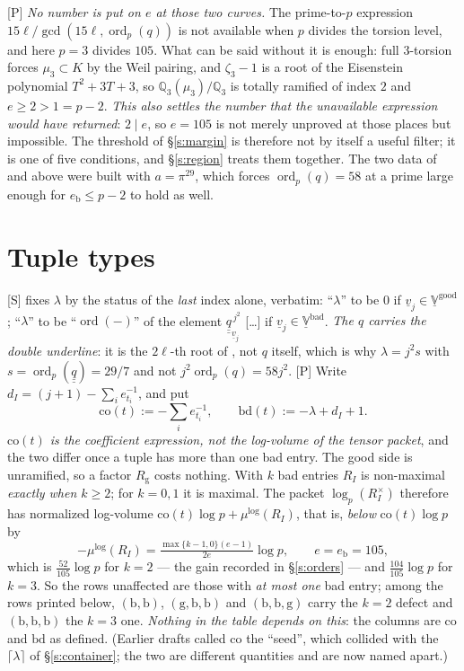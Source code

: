\documentclass[11pt]{article}
\theoremstyle{plain}
\theoremstyle{definition}
\newcommand{\Vbad}{\underline{\mathbb{V}}^{\mathrm{bad}}}
\newcommand{\ord}{\operatorname{ord}}
\newcommand{\qbb}{\underline{\underline q}}
\begin{document}
\textup{[P]} \emph{No number is put on $e$ at those two curves.}  The prime-to-$p$
expression $15\ell/\gcd(15\ell,\ord_p(q))$ is not available when $p$
divides the torsion level, and here $p=3$ divides $105$.  What can be said without it is
enough: full $3$-torsion forces $\mu_3\subset K$ by the Weil pairing, and
$\zeta_3-1$ is a root of the Eisenstein polynomial $T^2+3T+3$, so
$\mathbb{Q}_3(\mu_3)/\mathbb{Q}_3$ is totally ramified of index $2$ and $e\ge2>1=p-2$.
\emph{This also settles the number that the unavailable expression would have
returned}: $2\mid e$, so $e=105$ is not merely unproved at those places but impossible.  The threshold of \S\ref{s:margin} is therefore not by itself
a useful filter; it is one of five conditions, and \S\ref{s:region} treats them
together.  The two data of \cite{First} and above were built with $a=\pi^{29}$, which
forces $\ord_p(q)=58$ at a prime large enough for $e_{\mathrm b}\le p-2$ to hold as
well.

\section{Tuple types}\label{s:tuple}

\textup{[S]} \cite[Thm.~1.10, Step (v)]{IUT4} fixes $\lambda$ by the status of the
\emph{last} index alone, verbatim: ``$\lambda$'' to be $0$ if $\underline
v_j\in\underline{\mathbb V}^{\mathrm{good}}$; ``$\lambda$'' to be ``$\ord(-)$'' of the
element $\qbb_{\underline v_j}^{\,j^2}$ [\dots] if $\underline v_j\in\Vbad$.
\emph{The $q$ carries the double underline}: it is the $2\ell$-th root of
\cite[Ex.~3.2(iv)]{IUT1}, not $q$ itself, which is why $\lambda=j^2s$ with
$s=\ord_p(\qbb)=29/7$ and not $j^2\ord_p(q)=58j^2$.  \textup{[P]} Write $d_I=(j+1)-\sum_i e_{t_i}^{-1}$, and put
\[
  \mathrm{co}(t):=-\sum_i e_{t_i}^{-1},\qquad
  \mathrm{bd}(t):=-\lambda+d_I+1 .
\]
\emph{$\mathrm{co}(t)$ is the coefficient expression, not the log-volume of the
tensor packet}, and the two differ once a tuple has more than one bad entry.  The good
side is unramified, so a factor $R_{\mathrm g}$ costs nothing.  With $k$ bad entries
$R_I$ is non-maximal \emph{exactly when $k\ge2$}; for $k=0,1$ it is maximal.  The packet
$\log_p(R_I^{\times})$ therefore has normalized log-volume
$\mathrm{co}(t)\log p+\mu^{\log}(R_I)$, that is, \emph{below} $\mathrm{co}(t)\log p$ by
\[
  -\mu^{\log}(R_I)=\tfrac{\max\{k-1,0\}(e-1)}{2e}\log p,\qquad e=e_{\mathrm b}=105,
\]
which is $\tfrac{52}{105}\log p$ for $k=2$ --- the gain recorded in \S\ref{s:orders} ---
and $\tfrac{104}{105}\log p$ for $k=3$.  So the rows unaffected are those with
\emph{at most one} bad entry; among the rows printed below, $(\mathrm b,\mathrm b)$,
$(\mathrm g,\mathrm b,\mathrm b)$ and $(\mathrm b,\mathrm b,\mathrm g)$ carry the
$k=2$ defect and $(\mathrm b,\mathrm b,\mathrm b)$ the $k=3$ one.  \emph{Nothing in the
table depends on this}: the columns are $\mathrm{co}$ and $\mathrm{bd}$ as defined.  (Earlier drafts called $\mathrm{co}$ the ``seed'',
which collided with the $\lceil\lambda\rceil$ of \S\ref{s:container}; the two are
different quantities and are now named apart.)
\end{document}
